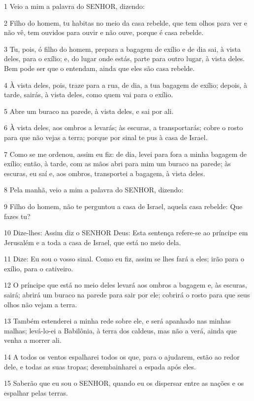 \par 1 Veio a mim a palavra do SENHOR, dizendo:
\par 2 Filho do homem, tu habitas no meio da casa rebelde, que tem olhos para ver e não vê, tem ouvidos para ouvir e não ouve, porque é casa rebelde.
\par 3 Tu, pois, ó filho do homem, prepara a bagagem de exílio e de dia sai, à vista deles, para o exílio; e, do lugar onde estás, parte para outro lugar, à vista deles. Bem pode ser que o entendam, ainda que eles são casa rebelde.
\par 4 À vista deles, pois, traze para a rua, de dia, a tua bagagem de exílio; depois, à tarde, sairás, à vista deles, como quem vai para o exílio.
\par 5 Abre um buraco na parede, à vista deles, e sai por ali.
\par 6 À vista deles, aos ombros a levarás; às escuras, a transportarás; cobre o rosto para que não vejas a terra; porque por sinal te pus à casa de Israel.
\par 7 Como se me ordenou, assim eu fiz: de dia, levei para fora a minha bagagem de exílio; então, à tarde, com as mãos abri para mim um buraco na parede; às escuras, eu saí e, aos ombros, transportei a bagagem, à vista deles.
\par 8 Pela manhã, veio a mim a palavra do SENHOR, dizendo:
\par 9 Filho do homem, não te perguntou a casa de Israel, aquela casa rebelde: Que fazes tu?
\par 10 Dize-lhes: Assim diz o SENHOR Deus: Esta sentença refere-se ao príncipe em Jerusalém e a toda a casa de Israel, que está no meio dela.
\par 11 Dize: Eu sou o vosso sinal. Como eu fiz, assim se lhes fará a eles; irão para o exílio, para o cativeiro.
\par 12 O príncipe que está no meio deles levará aos ombros a bagagem e, às escuras, sairá; abrirá um buraco na parede para sair por ele; cobrirá o rosto para que seus olhos não vejam a terra.
\par 13 Também estenderei a minha rede sobre ele, e será apanhado nas minhas malhas; levá-lo-ei a Babilônia, à terra dos caldeus, mas não a verá, ainda que venha a morrer ali.
\par 14 A todos os ventos espalharei todos os que, para o ajudarem, estão ao redor dele, e todas as suas tropas; desembainharei a espada após eles.
\par 15 Saberão que eu sou o SENHOR, quando eu os dispersar entre as nações e os espalhar pelas terras.
